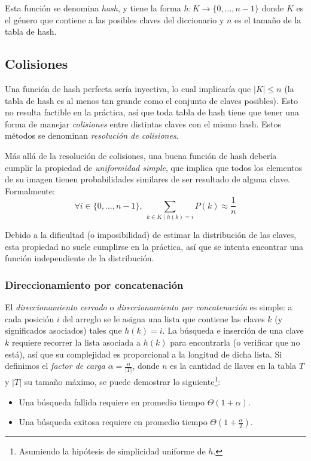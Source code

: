 \documentclass{article}
\newcommand{\BigTheta}[1]{{\Theta(#1)}}
\begin{document}
    Esta función se denomina \textit{hash}, y tiene la forma $h: K \rightarrow \{0, ..., n-1\}$ donde $K$ es el género que contiene a las posibles claves del diccionario y $n$ es el tamaño de la tabla de hash.

    \subsection{Colisiones}

    Una función de hash perfecta sería inyectiva, lo cual implicaría que $|K| \leq n$ (la tabla de hash es al menos tan grande como el conjunto de claves posibles). Esto no resulta factible en la práctica, así que toda tabla de hash tiene que tener una forma de manejar \textit{colisiones} entre distintas claves con el mismo hash. Estos métodos se denominan \textit{resolución de colisiones}.

    Más allá de la resolución de colisiones, una buena función de hash debería cumplir la propiedad de \textit{uniformidad simple}, que implica que todos los elementos de su imagen tienen probabilidades similares de ser resultado de alguna clave. Formalmente:
$$\forall i \in \{0, ..., n-1\},\ \sum_{k \in K \mid h(k) = i} P(k) \approx \frac{1}{n}$$

Debido a la dificultad (o imposibilidad) de estimar la distribución de las claves, esta propiedad no suele cumplirse en la práctica, así que se intenta encontrar una función independiente de la distribución.

\subsubsection{Direccionamiento por concatenación}

El \textit{direccionamiento cerrado} o \textit{direccionamiento por concatenación} es simple: a cada posición $i$ del arreglo se le asigna una lista que contiene las claves $k$ (y significados asociados) tales que $h(k) = i$. La búsqueda e inserción de una clave $k$ requiere recorrer la lista asociada a $h(k)$ para encontrarla (o verificar que no está), así que su complejidad es proporcional a la longitud de dicha lista. Si definimos el \textit{factor de carga} $\alpha = \frac{n}{|T|}$, donde $n$ es la cantidad de llaves en la tabla $T$ y $|T|$ su tamaño máximo, se puede demostrar lo siguiente\footnote{Asumiendo la hipótesis de simplicidad uniforme de $h$.}:
\begin{itemize}
    \item Una búsqueda fallida requiere en promedio tiempo $\BigTheta{1 + \alpha}$.
    \item Una búsqueda exitosa requiere en promedio tiempo $\BigTheta{1 + \frac{\alpha}{2}}$.
\end{itemize}
\end{document}
